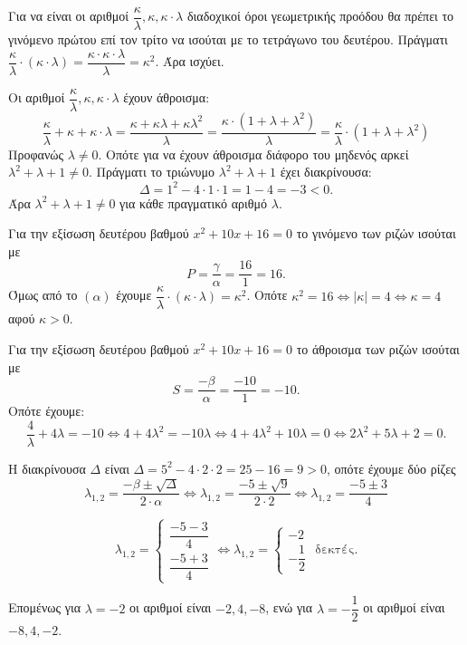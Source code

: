 
\begin{alist}
\item Για να είναι οι αριθμοί $\dfrac{\kappa}{\lambda} , \kappa, \kappa \cdot \lambda$ διαδοχικοί όροι γεωμετρικής προόδου θα πρέπει το γινόμενο πρώτου επί τον τρίτο να ισούται με το τετράγωνο του δευτέρου.
Πράγματι $\dfrac{\kappa}{\lambda} \cdot (\kappa \cdot \lambda) = \dfrac{\kappa \cdot \kappa \cdot \lambda}{\lambda} = \kappa^2$.
Άρα ισχύει.

\item Οι αριθμοί $\dfrac{\kappa}{\lambda} , \kappa, \kappa \cdot \lambda$ έχουν άθροισμα:
\[\dfrac{\kappa}{\lambda} + \kappa + \kappa \cdot \lambda = \dfrac{\kappa + \kappa\lambda + \kappa\lambda^2}{\lambda} = \dfrac{\kappa \cdot (1 + \lambda + \lambda^2)}{\lambda} = \dfrac{\kappa}{\lambda} \cdot (1 + \lambda + \lambda^2)\]
Προφανώς $\lambda \ne 0$.
Οπότε για να έχουν άθροισμα διάφορο του μηδενός αρκεί $\lambda^2 + \lambda + 1 \ne 0$.
Πράγματι το τριώνυμο $\lambda^2 + \lambda + 1$ έχει διακρίνουσα:
\[\Delta = 1^2 - 4 \cdot 1 \cdot 1 = 1 - 4 = -3 < 0.\]
Άρα $\lambda^2 + \lambda + 1 \ne 0$ για κάθε πραγματικό αριθμό $\lambda$.

\item Για την εξίσωση δευτέρου βαθμού $x^2 + 10x + 16 = 0$ το γινόμενο των ριζών ισούται με
\[P = \dfrac{\gamma}{\alpha} = \dfrac{16}{1} = 16.\]
Όμως από το $(\alpha)$ έχουμε $\dfrac{\kappa}{\lambda} \cdot (\kappa \cdot \lambda) = \kappa^2$.
Οπότε $\kappa^2 = 16 \Leftrightarrow |\kappa| = 4 \Leftrightarrow \kappa = 4$ αφού $\kappa > 0$.

Για την εξίσωση δευτέρου βαθμού $x^2 + 10x + 16 = 0$ το άθροισμα των ριζών ισούται με
\[S = \dfrac{-\beta}{\alpha} = \dfrac{-10}{1} = -10.\]
Οπότε έχουμε:
\[\dfrac{4}{\lambda} + 4\lambda = -10 \Leftrightarrow 4 + 4\lambda^2 = -10\lambda \Leftrightarrow 4 + 4\lambda^2 + 10\lambda = 0 \Leftrightarrow 2\lambda^2 + 5\lambda + 2 = 0.\]

Η διακρίνουσα $\Delta$ είναι $\Delta = 5^2 - 4 \cdot 2 \cdot 2 = 25 - 16 = 9 > 0$, οπότε έχουμε δύο ρίζες
\[\lambda_{1,2} = \dfrac{-\beta \pm \sqrt{\Delta}}{2 \cdot \alpha} \Leftrightarrow \lambda_{1,2} = \dfrac{-5 \pm \sqrt{9}}{2 \cdot 2} \Leftrightarrow \lambda_{1,2} = \dfrac{-5 \pm 3}{4}\]

\[\lambda_{1,2} = \begin{cases} \dfrac{-5 - 3}{4} \\ \dfrac{-5 + 3}{4} \end{cases} \Leftrightarrow \lambda_{1,2} = \begin{cases} -2 \\ -\dfrac{1}{2} \end{cases}\text{ δεκτές.}\]

Επομένως για $\lambda = -2$ οι αριθμοί είναι $-2, 4, -8$, ενώ για $\lambda = -\dfrac{1}{2}$ οι αριθμοί είναι $-8, 4, -2$.
\end{alist}

